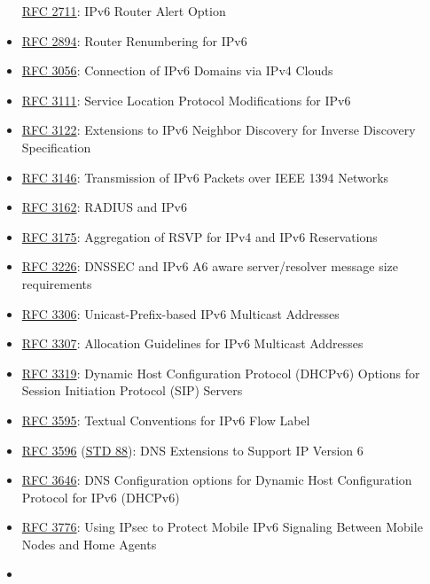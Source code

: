 \documentclass[
]{article}
\begin{document}
\begin{itemize}
  \href{https://www.rfc-editor.org/info/rfc2711}{RFC 2711}: IPv6 Router
  Alert Option
\item
  \href{https://www.rfc-editor.org/info/rfc2894}{RFC 2894}: Router
  Renumbering for IPv6
\item
  \href{https://www.rfc-editor.org/info/rfc3056}{RFC 3056}: Connection
  of IPv6 Domains via IPv4 Clouds
\item
  \href{https://www.rfc-editor.org/info/rfc3111}{RFC 3111}: Service
  Location Protocol Modifications for IPv6
\item
  \href{https://www.rfc-editor.org/info/rfc3122}{RFC 3122}: Extensions
  to IPv6 Neighbor Discovery for Inverse Discovery Specification
\item
  \href{https://www.rfc-editor.org/info/rfc3146}{RFC 3146}: Transmission
  of IPv6 Packets over IEEE 1394 Networks
\item
  \href{https://www.rfc-editor.org/info/rfc3162}{RFC 3162}: RADIUS and
  IPv6
\item
  \href{https://www.rfc-editor.org/info/rfc3175}{RFC 3175}: Aggregation
  of RSVP for IPv4 and IPv6 Reservations
\item
  \href{https://www.rfc-editor.org/info/rfc3226}{RFC 3226}: DNSSEC and
  IPv6 A6 aware server/resolver message size requirements
\item
  \href{https://www.rfc-editor.org/info/rfc3306}{RFC 3306}:
  Unicast-Prefix-based IPv6 Multicast Addresses
\item
  \href{https://www.rfc-editor.org/info/rfc3307}{RFC 3307}: Allocation
  Guidelines for IPv6 Multicast Addresses
\item
  \href{https://www.rfc-editor.org/info/rfc3319}{RFC 3319}: Dynamic Host
  Configuration Protocol (DHCPv6) Options for Session Initiation
  Protocol (SIP) Servers
\item
  \href{https://www.rfc-editor.org/info/rfc3595}{RFC 3595}: Textual
  Conventions for IPv6 Flow Label
\item
  \href{https://www.rfc-editor.org/info/rfc3596}{RFC 3596}
  (\href{https://www.rfc-editor.org/info/std88}{STD 88}): DNS Extensions
  to Support IP Version 6
\item
  \href{https://www.rfc-editor.org/info/rfc3646}{RFC 3646}: DNS
  Configuration options for Dynamic Host Configuration Protocol for IPv6
  (DHCPv6)
\item
  \href{https://www.rfc-editor.org/info/rfc3776}{RFC 3776}: Using IPsec
  to Protect Mobile IPv6 Signaling Between Mobile Nodes and Home Agents
\item

\end{itemize}
\end{document}

